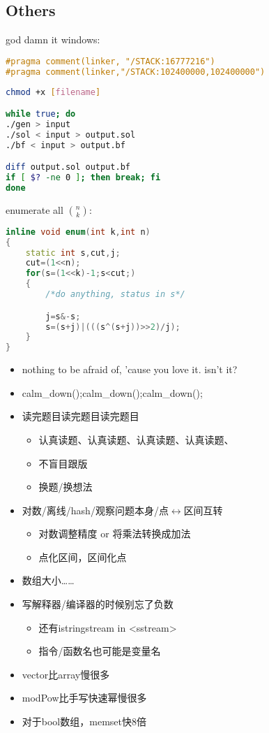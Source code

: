 \subsection{Others}
god damn it windows:\\
\begin{lstlisting}[language=C++]
#pragma comment(linker, "/STACK:16777216")
#pragma comment(linker,"/STACK:102400000,102400000")
\end{lstlisting}


\begin{lstlisting}[language=sh]
chmod +x [filename]

while true; do
./gen > input
./sol < input > output.sol
./bf < input > output.bf

diff output.sol output.bf
if [ $? -ne 0 ]; then break; fi
done
\end{lstlisting}

enumerate all $\binom{n}{k}$:\\
\begin{lstlisting}[language=C++]
inline void enum(int k,int n)
{
    static int s,cut,j;
    cut=(1<<n);
    for(s=(1<<k)-1;s<cut;)
    {
        /*do anything, status in s*/

        j=s&-s;
        s=(s+j)|(((s^(s+j))>>2)/j);
    }
}
\end{lstlisting}

\begin{itemize}
\item nothing to be afraid of, 'cause you love it. isn't it?
\item calm\_down();calm\_down();calm\_down();
\item 读完题目读完题目读完题目
\begin{itemize}
\item 认真读题、认真读题、认真读题、认真读题、
\item 不盲目跟版
\item 换题/换想法
\end{itemize}
\item 对数/离线/hash/观察问题本身/点$\leftrightarrow$区间互转
\begin{itemize}
\item 对数调整精度 or 将乘法转换成加法
\item 点化区间，区间化点
\end{itemize}
\item 数组大小……
\item 写解释器/编译器的时候别忘了负数
\begin{itemize}
\item 还有istringstream in <sstream>
\item 指令/函数名也可能是变量名
\end{itemize}
\item vector比array慢很多
\item modPow比手写快速幂慢很多
\item 对于bool数组，memset快8倍
\end{itemize}
